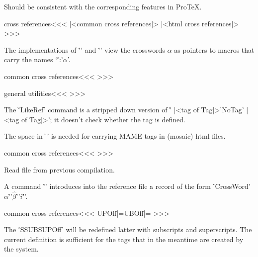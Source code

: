  


Should be  consistent with the corresponding features in ProTeX.


\<cross references\><<<
|<common cross references|>
\ifHtml  |<html cross references|>
\fi
>>>



The implementations of \''\Ref' and \''\Tag' view the crosswords $\alpha$ as 
pointers to macros that carry  the names `\''\cw:'$\alpha$'. 

\<common cross references\><<<
\def\Ref#1{\expandafter\ifx
                 \csname |<tag of Tag|>#1\endcsname \relax \:NoTag{#1}%
           \else \csname |<tag of Tag|>#1\endcsname    \fi}
>>>


\<general utilities\><<<
\def\ifTag#1#2#3{\expandafter\ifx
   \csname |<tag of Tag|>#1\endcsname \relax #3\else #2\fi}
>>>








The \`'\:LikeRef' command is a stripped down version of
\`'\Ref'; it doesn't check whether the tag is defined.

The space in \`'\space' is needed for carrying MAME tags
in (mosaic) html files.

\<common cross references\><<<
\def\LikeRef#1{\expandafter\ifx
                 \csname |<tag of Tag|>#1\endcsname \relax \space%
          \else  \csname |<tag of Tag|>#1\endcsname    \fi}
\def\:LikeRef#1{\csname  |<tag of Tag|>#1\endcsname}
>>>


Read file from previous compilation.





A command \''' introduces into the
reference file a record
 of the form
\''\:CrossWord{'$\alpha$\''}{'$\hat\beta$\''}{'$i$\''}'.


\<common cross references\><<<
\let\:SUPOff|=\empty \let\:SUBOff|=\empty
\def\Tag#1#2{\begingroup   \:SUPOff  \:SUBOff \a:xref \escapechar=`\\%
   \edef\:head{\string\:CrossWord{#1}{#2}}%
   \expandafter \expandafter \expandafter
   \:writeref\expandafter{\:head{\folio}\prcnt:ch}%
\endgroup}
>>>

The \''\:SUBSUPOff' will be redefined latter with subscripts and
superscripts.   The current definition is sufficient for the
tags that in the meantime are created by the system.


